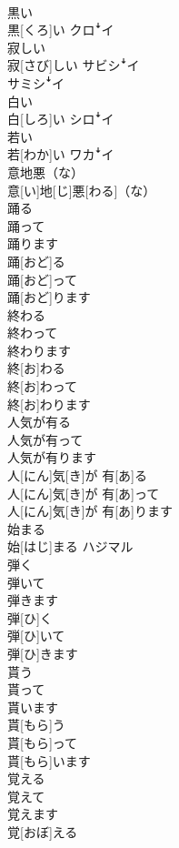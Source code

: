 \documentclass[8pt]{extreport}
\begin{document}
\begin{CJK}{UTF8}{min}
\\	黒い	
\\	黒[くろ]い	クロꜜイ
\\	寂しい	
\\	寂[さび]しい	サビシꜜイ 
\\	サミシꜜイ
\\	白い	
\\	白[しろ]い	シロꜜイ
\\	若い	
\\	若[わか]い	ワカꜜイ
\\	意地悪（な）	
\\	意[い]地[じ]悪[わる]（な）	
\\	踊る 
\\	踊って 
\\	踊ります	
\\	踊[おど]る 
\\	踊[おど]って 
\\	踊[おど]ります	
\\	終わる 
\\	終わって 
\\	終わります	
\\	終[お]わる 
\\	終[お]わって 
\\	終[お]わります	
\\	人気が有る 
\\	人気が有って 
\\	人気が有ります	
\\	人[にん]気[き]が 有[あ]る 
\\	人[にん]気[き]が 有[あ]って 
\\	人[にん]気[き]が 有[あ]ります	
\\	始まる	
\\	始[はじ]まる	ハジマル
\\	弾く 
\\	弾いて 
\\	弾きます	
\\	弾[ひ]く 
\\	弾[ひ]いて 
\\	弾[ひ]きます	
\\	貰う 
\\	貰って 
\\	貰います	
\\	貰[もら]う 
\\	貰[もら]って 
\\	貰[もら]います	
\\	覚える 
\\	覚えて 
\\	覚えます	
\\	覚[おぼ]える 

\end{CJK}
\end{document}
